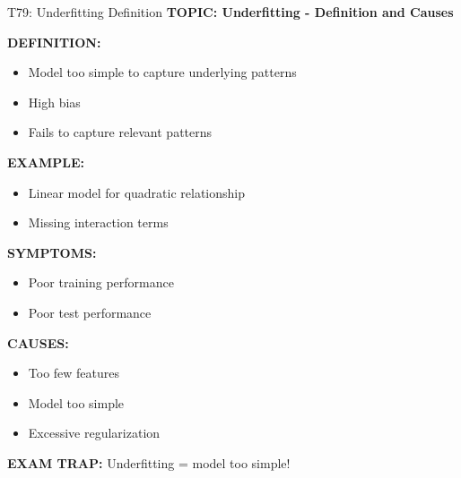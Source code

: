\documentclass[8pt]{beamer}
\begin{document}
	\begin{frame}{T79: Underfitting Definition}
		\fontsize{6.5}{7.5}\selectfont
		\textbf{TOPIC: Underfitting - Definition and Causes}
		
		\vspace{0.1cm}
		\textbf{DEFINITION:}
		\begin{itemize}
			\item Model too simple to capture underlying patterns
			\item High bias
			\item Fails to capture relevant patterns
		\end{itemize}
		
		\vspace{0.1cm}
		\textbf{EXAMPLE:}
		\begin{itemize}
			\item Linear model for quadratic relationship
			\item Missing interaction terms
		\end{itemize}
		
		\vspace{0.1cm}
		\textbf{SYMPTOMS:}
		\begin{itemize}
			\item Poor training performance
			\item Poor test performance
		\end{itemize}
		
		\vspace{0.1cm}
		\textbf{CAUSES:}
		\begin{itemize}
			\item Too few features
			\item Model too simple
			\item Excessive regularization
		\end{itemize}
		
		\textcolor{myred}{\textbf{EXAM TRAP:}} Underfitting = \textcolor{myblue}{model too simple}!
	\end{frame}
	
\end{document}
